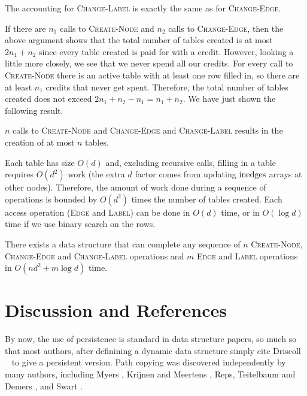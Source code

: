The accounting for \textsc{Change-Label} is exactly the same as for
\textsc{Change-Edge}.

If there are $n_1$ calls to \textsc{Create-Node} and $n_2$ calls to \textsc{Change-Edge}, then the above argument shows that the total number of tables created is at most $2n_1+n_2$ since every table created is paid for with a credit.  However, looking a little more closely, we see that we never spend all our credits.  For every call to \textsc{Create-Node} there is an active table with at least one row filled in, so there are at least $n_1$ credits that never get spent.  Therefore, the total number of tables created does not exceed $2n_1 + n_2 - n_1 = n_1+n_2$.
We have just shown the following result.

\begin{lem}
$n$ calls to \textsc{Create-Node} and \textsc{Change-Edge} and
\textsc{Change-Label} results in the creation of at most $n$ tables.
\end{lem}

Each table has size $O(d)$ and, excluding recursive calls, filling in
a table requires $O(d^2)$ work (the extra $d$ factor comes from
updating $\mathrm{inedges}$ arrays at other nodes).  Therefore, the amount of
work done during a sequence of operations is bounded by $O(d^2)$ times
the number of tables created.  Each access operation (\textsc{Edge}
and \textsc{Label}) can be done in $O(d)$ time, or in $O(\log d)$ time
if we use binary search on the rows.

\begin{thm}
There exists a data structure that can complete any sequence of $n$
\textsc{Create-Node}, \textsc{Change-Edge} and \textsc{Change-Label}
operations and $m$ \textsc{Edge} and \textsc{Label} operations
in $O(nd^2+m\log d)$ time.
\end{thm}

\section{Discussion and References}

By now, the use of persistence is standard in data structure papers,
so much so that most authors, after definining a dynamic data
structure simply cite Driscoll \etal\ \cite{dsst89} to give a
persistent version.  Path copying was discovered independently by many
authors, including Myers \cite{m82,m84}, Krijnen and Meertens
\cite{km83}, Reps, Teitelbaum and Demers \cite{rtd83}, and Swart
\cite{s85}.

